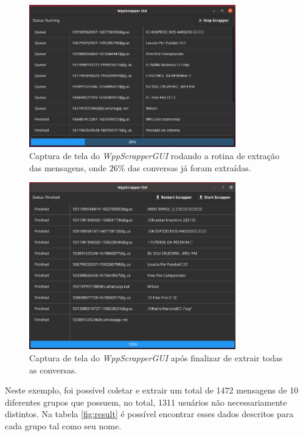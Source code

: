 \begin{figure}[!htb]
    \centering
    \includegraphics[width=0.8\textwidth]{img/wppscrapper-running2.png}
    \caption{Captura de tela do \textit{WppScrapperGUI} rodando a rotina de extração das mensagens, onde $26\%$ das conversas já foram extraídas.}
    \label{fig:wppscrapper-running2}
\end{figure}

\begin{figure}[!htb]
    \centering
    \includegraphics[width=0.8\textwidth]{img/wppscrapper-finished.png}
    \caption{Captura de tela do \textit{WppScrapperGUI} após finalizar de extrair todas as conversas.}
    \label{fig:wppscrapper-finished}
\end{figure}

Neste exemplo, foi possível coletar e extrair um total de 1472 mensagens de 10 diferentes grupos que possuem, no total, 1311 usuários não necessariamente distintos. Na tabela \ref{fig:result} é possível encontrar esses dados descritos para cada grupo tal como seu nome.

